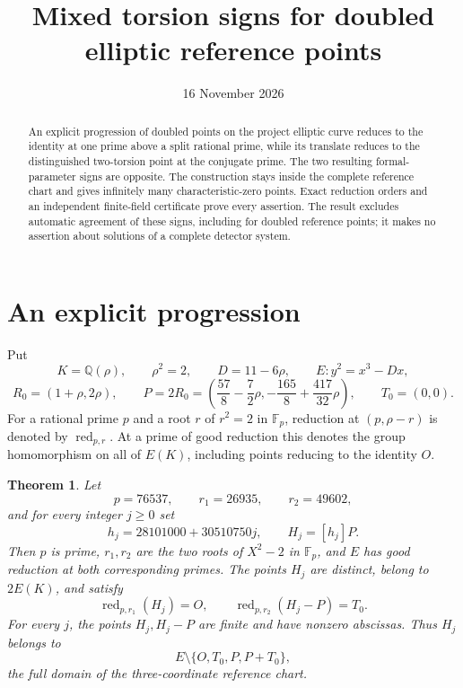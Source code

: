 \documentclass[11pt,a4paper]{article}
\title{Mixed torsion signs for doubled elliptic reference points}
\author{}\date{16 November 2026}
\newtheorem{theorem}{Theorem}[section]
\newcommand{\Q}{\mathbb Q}\newcommand{\Z}{\mathbb Z}\newcommand{\F}{\mathbb F}
\begin{document}
\maketitle
\begin{abstract}
An explicit progression of doubled points on the project elliptic curve
reduces to the identity at one prime above a split rational prime, while
its translate reduces to the distinguished two-torsion point at the
conjugate prime. The two resulting formal-parameter signs are opposite.
The construction stays inside the complete reference chart and gives
infinitely many characteristic-zero points. Exact reduction orders and
an independent finite-field certificate prove every assertion. The
result excludes automatic agreement of these signs, including for
doubled reference points; it makes no assertion about solutions of a
complete detector system.
\end{abstract}

\section{An explicit progression}
Put
\[
 K=\Q(\rho),\qquad \rho^2=2,\qquad D=11-6\rho,
 \qquad E:y^2=x^3-Dx,
\]
\[
 R_0=(1+\rho,2\rho),\qquad
 P=2R_0=\left(\frac{57}{8}-\frac72\rho,
                  -\frac{165}{8}+\frac{417}{32}\rho\right),
 \qquad T_0=(0,0).
\]
For a rational prime $p$ and a root $r$ of $r^2=2$ in $\F_p$,
reduction at $(p,\rho-r)$ is denoted by $\operatorname{red}_{p,r}$.
At a prime of good reduction this denotes the group homomorphism
on all of $E(K)$, including points reducing to the identity $O$.

\begin{theorem}\label{thm:progression}
Let
\[
 p=76537,\qquad r_1=26935,\qquad r_2=49602,
\]
and for every integer $j\ge0$ set
\[
 h_j=28101000+30510750j,\qquad H_j=[h_j]P.
\]
Then $p$ is prime, $r_1,r_2$ are the two roots of $X^2-2$ in
$\F_p$, and $E$ has good reduction at both corresponding primes.
The points $H_j$ are distinct, belong to $2E(K)$, and satisfy
\[
 \operatorname{red}_{p,r_1}(H_j)=O,
 \qquad
 \operatorname{red}_{p,r_2}(H_j-P)=T_0.
\]
For every $j$, the points $H_j,H_j-P$ are finite and have nonzero
abscissas. Thus $H_j$ belongs to
\[
                     E\setminus\{O,T_0,P,P+T_0\},
\]
the full domain of the three-coordinate reference chart.
\end{theorem}
\end{document}

